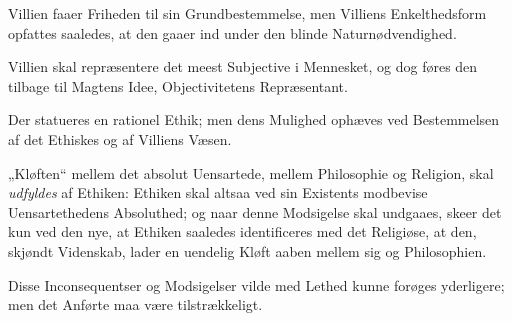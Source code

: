 \documentclass[12pt,a4paper]{book}
\begin{document}
Villien faaer Friheden til sin Grundbestemmelse, men Villiens Enkelthedsform opfattes saaledes,
at den gaaer ind under den blinde Naturnødvendighed.

Villien skal repræsentere det meest Subjective i Mennesket, og dog føres den tilbage til
Magtens Idee, Objectivitetens Repræsentant.

Der statueres en rationel Ethik; men dens Mulighed ophæves ved Bestemmelsen af det Ethiskes og
af Villiens Væsen.

„Kløften“ mellem det absolut Uensartede, mellem Philosophie og Religion, skal \emph{udfyldes} af
Ethiken: Ethiken skal altsaa ved sin Existents modbevise Uensartethedens Absoluthed; og naar
denne Modsigelse skal undgaaes, skeer det kun ved den nye, at Ethiken saaledes identificeres med
det Religiøse, at den, skjøndt Videnskab, lader en uendelig Kløft aaben mellem sig og
Philosophien.

Disse Inconsequentser og Modsigelser vilde med Lethed kunne forøges yderligere; men det Anførte
maa være tilstrækkeligt.
\end{document}
